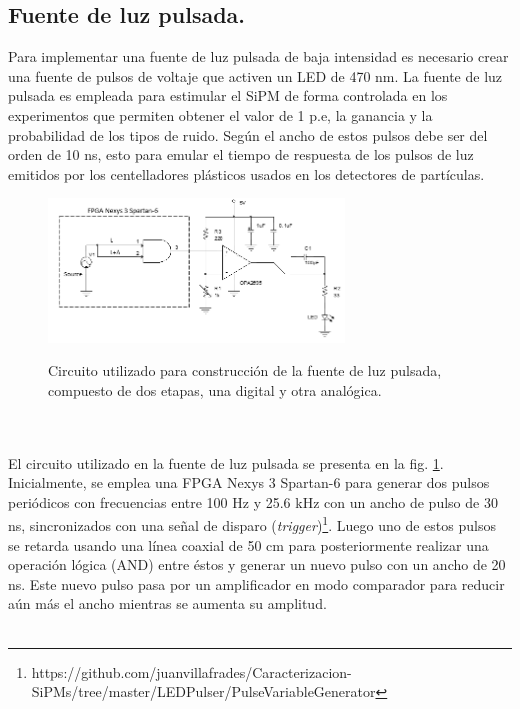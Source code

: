 \subsection{Fuente de luz pulsada.}
Para implementar una fuente de luz pulsada de baja intensidad es necesario crear una fuente de pulsos de voltaje que activen un LED de 470 nm. La fuente de luz pulsada es  empleada para estimular el SiPM de forma controlada en los experimentos que permiten obtener el valor de 1 p.e, la ganancia y la probabilidad de los tipos de ruido. Según \citep{Deisgn_LED_driver} el ancho de estos pulsos debe ser del orden de 10 ns, esto para emular el tiempo de respuesta de los pulsos de luz emitidos por los centelladores plásticos usados en los detectores de partículas.  
\begin{figure}[h!]
\begin{centering}
    \caption{Circuito utilizado para construcción de la fuente de luz pulsada, compuesto de dos etapas, una digital y otra analógica.}
    \includegraphics[width=0.7\textwidth]{Images/LED_circuit.PNG}
    \label{fig:LED_circuit}
  \par\end{centering}
\end{figure}
\\ \\
El circuito utilizado en la fuente de luz pulsada se presenta en la fig. \ref{fig:LED_circuit}. Inicialmente, se emplea una FPGA Nexys 3 Spartan-6 para generar dos pulsos periódicos con frecuencias entre 100 Hz y 25.6 kHz con un ancho de pulso de 30 ns, sincronizados con una señal de disparo (\textit{trigger})\footnote{https://github.com/juanvillafrades/Caracterizacion-SiPMs/tree/master/LEDPulser/PulseVariableGenerator}. Luego uno de estos pulsos se retarda usando una línea coaxial de 50 cm para posteriormente realizar una operación lógica (AND) entre éstos y generar un nuevo pulso con un ancho de 20 ns. Este nuevo pulso pasa por un amplificador en  modo comparador para reducir aún más el ancho mientras se aumenta su amplitud. \\ \\
